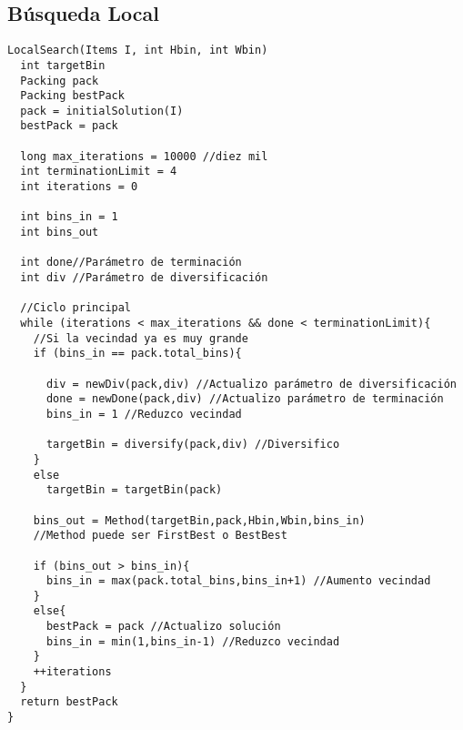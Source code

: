 \documentclass[a4paper,10pt]{article}
\begin{document}
\subsection{Búsqueda Local}
\begin{verbatim}
LocalSearch(Items I, int Hbin, int Wbin)                                                                                 
  int targetBin                                                                                                                                  
  Packing pack                                                                                                                                               
  Packing bestPack                                                                                                                                          
  pack = initialSolution(I)                                                                                                                         
  bestPack = pack                                                                                                                                           
                                                                                                                                                             
  long max_iterations = 10000 //diez mil
  int terminationLimit = 4
  int iterations = 0

  int bins_in = 1
  int bins_out

  int done//Parámetro de terminación
  int div //Parámetro de diversificación

  //Ciclo principal
  while (iterations < max_iterations && done < terminationLimit){
    //Si la vecindad ya es muy grande
    if (bins_in == pack.total_bins){
      
      div = newDiv(pack,div) //Actualizo parámetro de diversificación
      done = newDone(pack,div) //Actualizo parámetro de terminación
      bins_in = 1 //Reduzco vecindad  

      targetBin = diversify(pack,div) //Diversifico
    }
    else
      targetBin = targetBin(pack)

    bins_out = Method(targetBin,pack,Hbin,Wbin,bins_in)
    //Method puede ser FirstBest o BestBest

    if (bins_out > bins_in){
      bins_in = max(pack.total_bins,bins_in+1) //Aumento vecindad
    }
    else{ 
      bestPack = pack //Actualizo solución
      bins_in = min(1,bins_in-1) //Reduzco vecindad
    }
    ++iterations
  }
  return bestPack
}
\end{verbatim}
\end{document}
